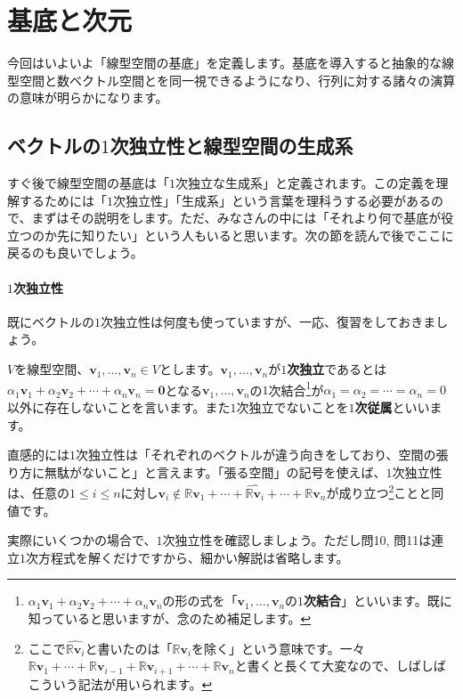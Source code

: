 \section{基底と次元}

今回はいよいよ「線型空間の基底」を定義します。基底を導入すると抽象的な線型空間と数ベクトル空間とを同一視できるようになり、行列に対する諸々の演算の意味が明らかになります。

\subsection{ベクトルの$1$次独立性と線型空間の生成系}

すぐ後で線型空間の基底は「$1$次独立な生成系」と定義されます。この定義を理解するためには「$1$次独立性」「生成系」という言葉を理科うする必要があるので、まずはその説明をします。ただ、みなさんの中には「それより何で基底が役立つのか先に知りたい」という人もいると思います。次の節を読んで後でここに戻るのも良いでしょう。

\paragraph{$1$次独立性} 既にベクトルの$1$次独立性は何度も使っていますが、一応、復習をしておきましょう。

$V$を線型空間、$\bm{v}_1, \ldots, \bm{v}_n \in V$とします。$\bm{v}_1, \ldots, \bm{v}_n$が\textbf{$1$次独立}であるとは$\alpha_1 \bm{v}_1 + \alpha_2 \bm{v}_2 + \cdots + \alpha_n \bm{v}_n = \bm{0}$となる$\bm{v}_1, \ldots, \bm{v}_n$の$1$次結合\footnote{$\alpha_1 \bm{v}_1 + \alpha_2 \bm{v}_2 + \cdots + \alpha_n \bm{v}_n$の形の式を「$\bm{v}_1, \ldots, \bm{v}_n$の\textbf{$1$次結合}」といいます。既に知っていると思いますが、念のため補足します。}が$\alpha_1 = \alpha_2 = \cdots = \alpha_n = 0$以外に存在しないことを言います。また$1$次独立でないことを\textbf{$1$次従属}といいます。

直感的には$1$次独立性は「それぞれのベクトルが違う向きをしており、空間の張り方に無駄がないこと」と言えます。「張る空間」の記号を使えば、$1$次独立性は、任意の$1\leq i \leq n$に対し$\bm{v}_i \not\in \mathbb{R}\bm{v}_1 + \cdots + \hat{\mathbb{R}\bm{v}_i} + \cdots + \mathbb{R}\bm{v}_n$が成り立つ\footnote{ここで$\hat{\mathbb{R}\bm{v}_i}$と書いたのは「$\mathbb{R}\bm{v}_i$を除く」という意味です。一々$\mathbb{R}\bm{v}_1 +\cdots + \mathbb{R}\bm{v}_{i - 1} + \mathbb{R}\bm{v}_{i + 1} + \cdots + \mathbb{R}\bm{v}_n$と書くと長くて大変なので、しばしばこういう記法が用いられます。}ことと同値です。

実際にいくつかの場合で、$1$次独立性を確認しましょう。ただし問10, 問11は連立$1$次方程式を解くだけですから、細かい解説は省略します。

